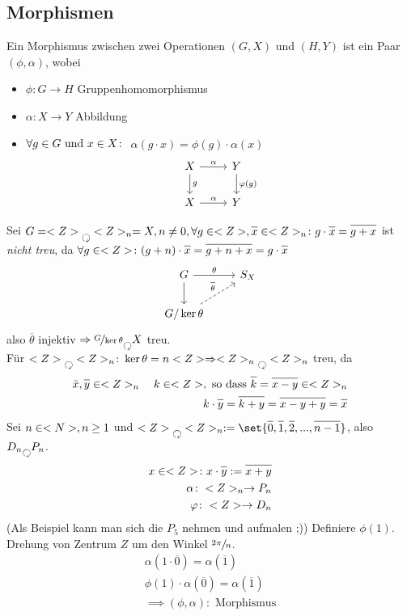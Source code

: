 \subsection*{Morphismen}
\begin{definition}
	Ein Morphismus zwischen zwei Operationen $(G,X)$ und $(H,Y)$ ist ein Paar $(\phi, \alpha)$, wobei
	\begin{itemize}
		\item $\phi\colon G \to H$ Gruppenhomomorphismus
		\item $\alpha\colon X \to Y$ Abbildung
		\item $\forall g \in G \text{ und } x \in X\colon$ $\alpha(g \cdot x) = \phi(g)\cdot \alpha(x)$
		\[
			\begin{tikzcd}
			X \arrow[r, "\alpha"] \arrow[d, "g"] & Y \arrow[d, "\phi(g)"] \\
			X \arrow[r, "\alpha"]                & Y                     
			\end{tikzcd}
		\] 
	\end{itemize}
\end{definition}
\begin{*example}
	Sei $G=\Z \Circlearrowleft \Z_n=X, n \neq 0, \forall g \in \Z, \overline{x} \in \Z_n\colon g \cdot \overline{x} = \overline{g+x}$ ist \emph{nicht treu}, da $\forall g \in \Z \colon (g+n)\cdot \overline{x} = \overline{g+n+x} = g \cdot \overline{x}$
	\[
		\begin{tikzcd}
		G \arrow[r, "\theta"] \arrow[d]                       & S_X \\
		G/\ker \theta \arrow[ru, "\overline{\theta}", dashed] &    
		\end{tikzcd}
	\]
	also $\overline{\theta}$ injektiv $\implies \lnkset{G}{\ker \theta} \Circlearrowleft X$ treu.\\
	Für $\Z \Circlearrowleft \Z_n \colon \ker \theta = n\Z \implies \Z_n \Circlearrowleft \Z_n$ treu, da
	\begin{align*}
		\overline{x}, \overline{y} \in \Z_n\quad k\in \Z, \text{ so dass } \overline{k} = \overline{x-y} \in \Z_n\\
		k \cdot \overline{y} = \overline{k+y} = \overline{x-y+y} = \overline{x}
	\end{align*}
	Sei $n \in <N>, n \ge 1$ und $\Z \Circlearrowleft \Z_n := \set{\overline{0}, \overline{1}, \overline{2}, ..., \overline{n-1}}$, also $D_n \Circlearrowleft P_n$.
	\begin{align*}
		x \in \Z \colon x \cdot \overline{y} := \overline{x+y}\\
		\alpha\colon \Z_n \to P_n\\
		\phi\colon \Z \to D_n
	\end{align*}
	(Als Beispiel kann man sich die $P_5$ nehmen und aufmalen ;))
	Definiere $\phi(1)$. Drehung von Zentrum $Z$ um den Winkel $\sfrac{2\pi}{n}$.
	\begin{align*}
		\alpha(1 \cdot \overline{0}) = \alpha(\overline{1})\\
		\phi(1)\cdot \alpha(\overline{0}) = \alpha(\overline{1})\\
		\implies (\phi,\alpha)\colon \text{ Morphismus}
	\end{align*}
\end{*example}
